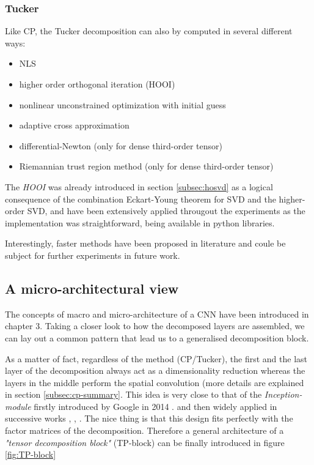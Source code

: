 \subsubsection{Tucker}
Like CP, the Tucker decomposition can also by computed in several different ways: 
\begin{itemize}
    \item NLS
    
    \item higher order orthogonal iteration (HOOI)

    \item nonlinear unconstrained optimization with initial guess
    
    \item adaptive cross approximation 
        
    \item differential-Newton (only for dense third-order tensor) 
    
    \item Riemannian trust region method (only for dense third-order tensor) 
\end{itemize}

The \emph{HOOI} was already introduced in section \ref{subsec:hosvd} as a logical consequence of the combination Eckart-Young theorem for SVD and the higher-order SVD, and have been extensively applied througout the experiments as the implementation was straightforward, being available in python libraries. 

Interestingly, faster methods have been proposed in literature \parencite{tucker-fast1} \parencite{tucker-fast2} and coule be subject for further experiments in future work.

\subsection{A micro-architectural view}
The concepts of macro and micro-architecture of a CNN have been introduced in chapter 3. Taking a closer look to how the decomposed layers are assembled, we can lay out a common pattern that lead us to a generalised decomposition block. 
\newline 

As a matter of fact, regardless of the method (CP/Tucker), the first and the last layer of the decomposition always act as a dimensionality reduction whereas the layers in the middle perform the spatial convolution (more details are explained in section \ref{subsec:cp-summary}. This idea is very close to that of the \emph{Inception-module} firstly introduced by Google in 2014 \parencite{googlenet}. and then widely applied in successive works \parencite{squeeznet}, \parencite{chollet}, \parencite{mobilenets}.  
\newline
The nice thing is that this design fits perfectly with the factor matrices of the decomposition.  
Therefore a general architecture of a \emph{"tensor decomposition block"} (TP-block) can be finally introduced in figure \ref{fig:TP-block}

